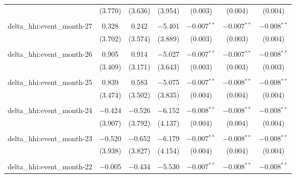 \begin{table}[H]
{\begin{tabular}{@{\extracolsep{5pt}}lcccccc}
   & (3.770) & (3.636) & (3.954) & (0.003) & (0.004) & (0.004) \\  

   & & & & & & \\  

  delta\_hhi:event\_month-27 & 0.328 & 0.242 & $-$5.401 & $-$0.007$^{**}$ & $-$0.007$^{**}$ & $-$0.008$^{**}$ \\  

   & (3.702) & (3.574) & (3.889) & (0.003) & (0.003) & (0.004) \\  

   & & & & & & \\  

  delta\_hhi:event\_month-26 & 0.905 & 0.914 & $-$5.027 & $-$0.007$^{**}$ & $-$0.007$^{**}$ & $-$0.008$^{**}$ \\  

   & (3.409) & (3.171) & (3.643) & (0.003) & (0.003) & (0.003) \\  

   & & & & & & \\  

  delta\_hhi:event\_month-25 & 0.839 & 0.583 & $-$5.075 & $-$0.007$^{**}$ & $-$0.008$^{**}$ & $-$0.008$^{**}$ \\  

   & (3.474) & (3.502) & (3.835) & (0.004) & (0.004) & (0.004) \\  

   & & & & & & \\  

  delta\_hhi:event\_month-24 & $-$0.424 & $-$0.526 & $-$6.152 & $-$0.008$^{**}$ & $-$0.008$^{**}$ & $-$0.008$^{**}$ \\  

   & (3.907) & (3.792) & (4.137) & (0.004) & (0.004) & (0.004) \\  

   & & & & & & \\  

  delta\_hhi:event\_month-23 & $-$0.520 & $-$0.652 & $-$6.179 & $-$0.007$^{**}$ & $-$0.008$^{**}$ & $-$0.008$^{**}$ \\  

   & (3.938) & (3.827) & (4.154) & (0.004) & (0.004) & (0.004) \\  

   & & & & & & \\  

  delta\_hhi:event\_month-22 & $-$0.005 & $-$0.434 & $-$5.530 & $-$0.007$^{**}$ & $-$0.008$^{**}$ & $-$0.008$^{**}$ \\  


\end{tabular}}
\end{table}
